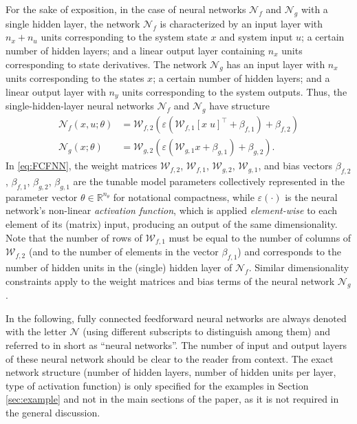 \documentclass{article} %
\newcommand{\NN}{\mathcal{N}} %
\newcommand{\nin}{n_u}
\newcommand{\ny}{n_y}
\newcommand{\nx}{n_x}
\newcommand{\ntheta}{n_\theta}
\begin{document}
 {For the sake of exposition, in the case of neural networks $\NN_f$ and $\NN_g$ with a single hidden layer, the  network $\NN_f$ is characterized by an input layer with $\nx + \nin$ units corresponding to the system state $x$ and system input $u$; a certain number of hidden layers; and a linear output layer containing $n_x$ units corresponding to state derivatives. The  network $\NN_g$ has an input layer with $\nx$ units corresponding to the states $x$; a certain number of hidden layers; and a linear output layer with $\ny$ units corresponding to the system outputs. Thus, the single-hidden-layer neural networks $\NN_f$ and $\NN_g$ have structure
\begin{subequations}
\label{eq:FCFNN}
\begin{align}
 \NN_f(x,u;\theta) &= \mathcal{W}_{f,2}\left(\varepsilon(\mathcal{W}_{f,1} [x\; u]^\top + \beta_{f,1}) + \beta_{f,2}\right)\\
 \NN_g(x;\theta) &= \mathcal{W}_{g,2}\left(\varepsilon(\mathcal{W}_{g,1} x +  \beta_{g,1}) + \beta_{g,2} \right).
 \end{align}
\end{subequations}
In \eqref{eq:FCFNN}, the weight matrices $\mathcal{W}_{f,2}$, $\mathcal{W}_{f,1}$, $\mathcal{W}_{g,2}$, $\mathcal{W}_{g,1}$, and bias vectors $\beta_{f,2}$, $\beta_{f,1}$, $\beta_{g,2}$, $\beta_{g,1}$ are the tunable model parameters collectively represented in the parameter vector $\theta \in \mathbb{R}^{\ntheta}$ for notational compactness, while $\varepsilon(\cdot)$ is the neural network's non-linear \emph{activation function}, which is applied \emph{element-wise} to each element of its (matrix) input, producing an output of the same dimensionality.
Note that the number of rows of $\mathcal{W}_{f,1}$ must be equal to the number of columns of 
$\mathcal{W}_{f,2}$ (and to the number of elements in the vector $\beta_{f,1}$) and corresponds to the number of hidden units in the (single) hidden layer of $\NN_f$. Similar dimensionality constraints apply to the weight matrices and bias terms of the neural network $\mathcal{N}_g$.
} 






{In the following, fully connected feedforward neural networks are always denoted with the letter
$\NN$ (using different subscripts to distinguish among them) and referred to in short as ``neural networks''. The number of input and output layers of these neural network should be clear to the reader from context. The exact network structure (number of hidden layers, number of hidden units per layer, type of activation function) is only specified for the examples in Section \ref{sec:example} and not in the main sections of the paper, as it is not required in the general discussion.}
\end{document}

